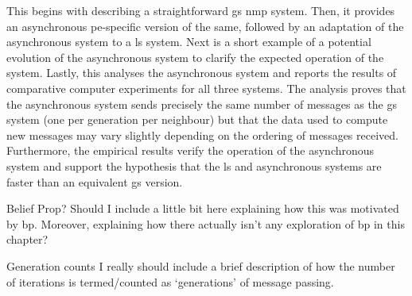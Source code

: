 This  begins with describing a straightforward \gls{gs} \gls{nmp} system.  Then, it provides an asynchronous \gls{pe}-specific version of the same, followed by an adaptation of the asynchronous system to a \gls{ls} system. Next is a short example of a potential evolution of the asynchronous system to clarify the expected operation of the system.  Lastly, this  analyses the asynchronous system and reports the results of comparative computer experiments for all three systems.  The analysis proves that the asynchronous system sends precisely the same number of messages as the \gls{gs} system (one per generation per neighbour) but that the data used to compute new messages may vary slightly depending on the ordering of messages received.  Furthermore, the empirical results verify the operation of the asynchronous system and support the hypothesis that the \gls{ls} and asynchronous systems are faster than an equivalent \gls{gs} version.

\begin{anfxwarning}{Belief Prop?}
Should I include a little bit here explaining how this was motivated by \gls{bp}.  Moreover, explaining how there actually isn't any exploration of \gls{bp} in this chapter?
\end{anfxwarning}

\begin{anfxerror}{Generation counts}
I really should include a brief description of how the number of iterations is termed/counted as `generations' of message passing.
\end{anfxerror}